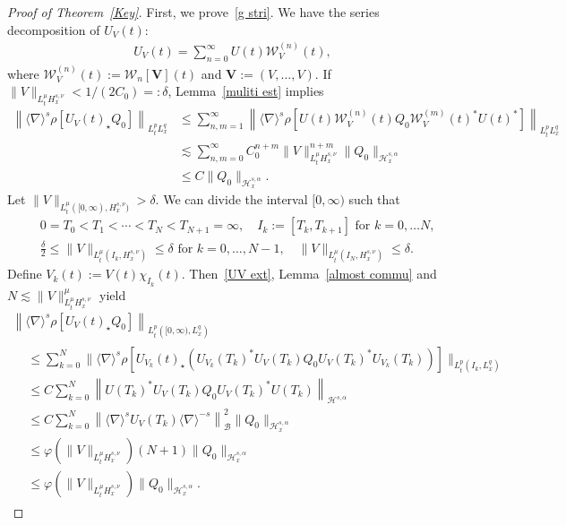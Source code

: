 \documentclass[AHL,Unicode,longabstracts,MathTools,published]{cedram}
\newcommand{\vV}{{\mathbf{V}}}
\newcommand{\CB}{\mathcal{B}}
\newcommand{\CH}{\mathcal{H}}
\newcommand{\CW}{\mathcal{W}}
\newcommand{\al}{\alpha}
\newcommand{\de}{\delta}
\newcommand{\ph}{\varphi}
\newcommand{\rh}{\rho}
\newcommand{\ch}{\chi}
\newcommand{\I}{\infty}
\newcommand{\sd}{\langle \nabla \rangle}
\newcommand{\st}{\star}
\newcommand{\ls}{\lesssim}
\begin{document}
\begin{proof}[{Proof of Theorem~\ref{Key}}]
First, we prove~\eqref{g stri}. We have the series decomposition of $U_V(t)$:
\begin{align}\label{UVWV}
U_V(t) = \sum_{n=0}^\I U(t)\CW_V^{(n)}(t),
\end{align}
where $\CW_V^{(n)}(t) := \CW_n[\vV](t)$ and $\vV:=(V,\dots, V)$. If $\|V\|_{L^\mu_t H^{s,\nu}_x} < 1/(2C_0)=:\de$, Lemma~\ref{muliti est} implies
\begin{equation}
\begin{split}
\left\|\sd^s \rh[U_V(t)_\st Q_0]\right\|_{L^p_t L^q_x} &\le \sum_{n,m=1}^\I \left\|\sd^s \rh\left[U(t)\CW_V^{(n)}(t) Q_0 \CW_V^{(m)}(t)^* U(t)^*\right]\right\|_{L^p_t L^q_x} \\
&\ls \sum_{n,m=0}^\I C_0^{n+m}
\|V\|_{L^\mu_t H^{s,\nu}_x}^{n+m}
\|Q_0\|_{\CH^{s,\al}_x} \\
&\le C
\|Q_0\|_{\CH^{s,\al}_x}.
\end{split}
\end{equation}
Let $\|V\|_{L^\mu_t([0,\I), H^{s,\nu}_x)} >\de$. We can divide the interval $[0,\I)$ such that
\begin{align}
&0=T_0 < T_1 < \cdots < T_N < T_{N+1}=\I, \quad I_k := [T_k,T_{k+1}] \text{ for } k=0, \dots N,\\
&\frac{\de}{2} \le \|V\|_{L^\mu_t(I_k,H^{s,\nu}_x)} \le \de \text{ for } k=0,\dots,N-1,
\quad \|V\|_{L^\mu_t(I_N,H^{s,\nu}_x)} \le \de.
\end{align}
Define $V_k(t) := V(t) \ch_{I_k}(t)$. Then~\eqref{UV ext}, Lemma~\ref{almost commu} and $N \lesssim \|V\|_{L^\mu_t H^{s,\nu}_x}^\mu$ yield
\begin{multline}
\left\|\sd^s \rh[U_V(t)_\st Q_0]\right\|_{L^p_t\left([0,\I),L^q_x\right)} \\
\begin{aligned}
&\le \sum_{k=0}^N
\big\|\sd^s \rh\left[U_{V_k}(t)_\st \left(U_{V_k}(T_k)^*U_V(T_k)Q_0U_V(T_k)^*U_{V_k}(T_k)\right)\right]\big\|_{L^p_t\left(I_k,L^q_x\right)} \\
&\le C \sum_{k=0}^N \left\|U(T_k)^*U_V(T_k)Q_0U_V(T_k)^*U(T_k)\right\|_{\CH^{s,\al}} \\
&\le C \sum_{k=0}^N \left\|\sd^s U_V(T_k) \sd^{-s}\right\|_{\CB}^2
\|Q_0\|_{\CH^{s,\al}_x} \\
&\le \ph\left(\|V\|_{L^\mu_t H^{s,\nu}_x}\right) (N+1) \|Q_0\|_{\CH^{s,\al}_x} \\
&\le \ph\left(\|V\|_{L^\mu_t H^{s,\nu}_x}\right) \|Q_0\|_{\CH^{s,\al}_x}.
\end{aligned}
\end{multline}


\end{proof}
\end{document}
